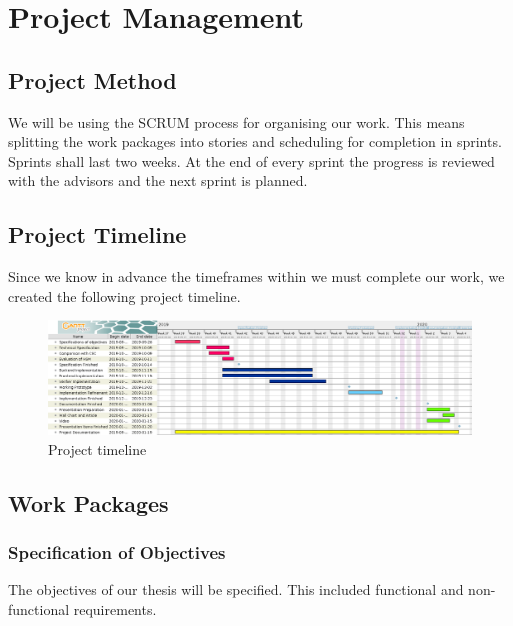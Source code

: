 \chapter{Project Management}
\label{ch:projectmanagement}

\section{Project Method}
\label{sec:projectmethod}
We will be using the SCRUM process for organising our work.
This means splitting the work packages into stories and scheduling for completion in sprints.
Sprints shall last two weeks. At the end of every sprint the progress is reviewed with the advisors and the next sprint is planned.

\section{Project Timeline}
\label{sec:projecttimeline}
Since we know in advance the timeframes within we must complete our work, we created the following project timeline.

\begin{landscape}
\vspace*{\fill}
	\begin{figure}[H]
	\begin{center}
		\includegraphics[scale=0.5]{images/Projectplan.png}
		\caption{Project timeline}
		\label{fig:projecttimeline}
	\end{center}
	\end{figure}
\vspace*{\fill}
\end{landscape}

\section{Work Packages}
\label{sec:workpackages}

\subsection{Specification of Objectives}\label{subsec:specification-of-objectives}
The objectives of our thesis will be specified.
This included functional and non-functional requirements.

